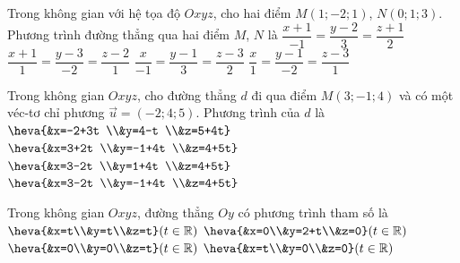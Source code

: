 \begin{ex}%
	Trong không gian với hệ tọa độ $Oxyz$, cho hai điểm $M(1;-2; 1)$, $N(0; 1; 3)$. Phương trình đường thẳng qua hai điểm $M$, $N$ là
	\choice
	{$\dfrac{x+1}{-1}=\dfrac{y-2}{3}=\dfrac{z+1}{2}$}
	{$\dfrac{x+1}{1}=\dfrac{y-3}{-2}=\dfrac{z-2}{1}$}
	{\True $\dfrac{x}{-1}=\dfrac{y-1}{3}=\dfrac{z-3}{2}$}
	{$\dfrac{x}{1}=\dfrac{y-1}{-2}=\dfrac{z-3}{1}$}
\end{ex}
\begin{ex}%
	Trong không gian $Oxyz$, cho đường thẳng $d$ đi qua điểm $M(3;-1; 4)$ và có một véc-tơ chỉ phương $\overrightarrow{u}=(-2; 4; 5)$. Phương trình của $d$ là
	\choice
	{$\heva{&x=-2+3t \\&y=4-t \\&z=5+4t}$}
	{$\heva{&x=3+2t \\&y=-1+4t \\&z=4+5t}$}
	{$\heva{&x=3-2t \\&y=1+4t \\&z=4+5t}$}
	{\True $\heva{&x=3-2t \\&y=-1+4t \\&z=4+5t}$}
\end{ex}
\begin{ex}%
	Trong không gian $Oxyz$, đường thẳng $Oy$ có phương trình tham số là
	\choice
	{$\heva{&x=t\\&y=t\\&z=t}(t\in \mathbb{R})$}
	{\True $\heva{&x=0\\&y=2+t\\&z=0}(t\in \mathbb{R})$}
	{$\heva{&x=0\\&y=0\\&z=t}(t\in \mathbb{R})$}
	{$\heva{&x=t\\&y=0\\&z=0}(t\in \mathbb{R})$}
\end{ex}

